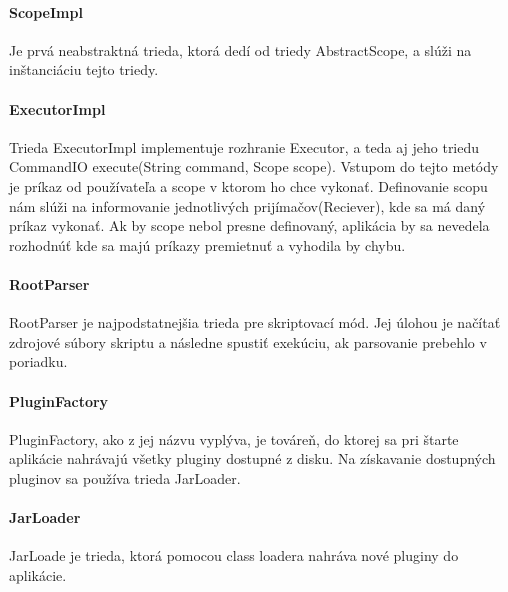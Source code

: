 \paragraph{ScopeImpl}
Je prvá neabstraktná trieda, ktorá dedí od triedy AbstractScope, a slúži na inštanciáciu tejto triedy. 
\paragraph{ExecutorImpl}
Trieda ExecutorImpl implementuje rozhranie Executor, a teda aj jeho triedu CommandIO execute(String command, Scope scope). Vstupom do tejto metódy je príkaz od používateľa a scope v ktorom ho chce vykonať. Definovanie scopu nám slúži na informovanie jednotlivých prijímačov(Reciever), kde sa má daný príkaz vykonať. Ak by scope nebol presne definovaný, aplikácia by sa nevedela rozhodnúť kde sa majú príkazy premietnuť a vyhodila by chybu.
\paragraph{RootParser}
RootParser je najpodstatnejšia trieda pre skriptovací mód. Jej úlohou je načítať zdrojové súbory skriptu a následne spustiť exekúciu, ak parsovanie prebehlo v poriadku.
\paragraph{PluginFactory}
PluginFactory, ako z jej názvu vyplýva, je továreň, do ktorej sa pri štarte aplikácie nahrávajú všetky pluginy dostupné z disku. Na získavanie dostupných pluginov sa používa trieda JarLoader. 
\paragraph{JarLoader}
JarLoade je trieda, ktorá pomocou class loadera nahráva nové pluginy do aplikácie.
